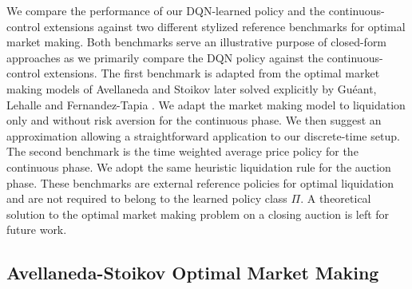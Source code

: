 \documentclass[11pt]{article}
\begin{document}
We compare the performance of our DQN-learned policy and the continuous-control extensions against two different stylized reference benchmarks for optimal market making. Both benchmarks serve an illustrative purpose of closed-form approaches as we primarily compare the DQN policy against the continuous-control extensions. The first benchmark is adapted from the optimal market making models of Avellaneda and Stoikov \cite{avellaneda2008high} later solved explicitly by Guéant, Lehalle and Fernandez-Tapia \cite{gueant2013dealing}. We adapt the market making model to liquidation only and without risk aversion for the continuous phase. We then suggest an approximation allowing a straightforward application to our discrete-time setup. The second benchmark is the time weighted average price policy for the continuous phase. We adopt the same heuristic liquidation rule for the auction phase. These benchmarks are external reference policies for optimal liquidation and are not required to belong to the learned policy class $\Pi$. A theoretical solution to the optimal market making problem on a closing auction is left for future work.

\subsection{Avellaneda-Stoikov Optimal Market Making}\label{section:AS}
\end{document}

